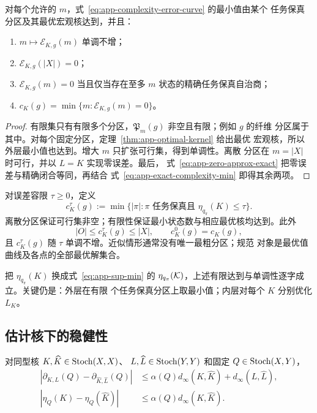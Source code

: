 \begin{theorem}
\label{thm:app-complexity-error-curve}
对每个允许的 $m$，式~\eqref{eq:app-complexity-error-curve} 的最小值由某个
任务保真分区及其最优宏观核达到，并且：
\begin{enumerate}
  \item $m\mapsto\mathcal E_{K,g}(m)$ 单调不增；
  \item $\mathcal E_{K,g}(|X|)=0$；
  \item $\mathcal E_{K,g}(m)=0$ 当且仅当存在至多 $m$ 状态的精确任务保真自治商；
  \item $c_K(g)=\min\{m:\mathcal E_{K,g}(m)=0\}$。
\end{enumerate}
\end{theorem}

\begin{proof}
有限集只有有限多个分区，$\mathfrak P_m(g)$ 非空且有限；例如 $g$ 的纤维
分区属于其中。对每个固定分区，定理~\ref{thm:app-optimal-kernel} 给出最优
宏观核，所以外层最小值也达到。增大 $m$ 只扩张可行集，得到单调性。离散
分区在 $m=|X|$ 时可行，并以 $L=K$ 实现零误差。最后，
式~\eqref{eq:app-zero-approx-exact} 把零误差与精确闭合等同，再结合
式~\eqref{eq:app-exact-complexity-min} 即得其余两项。
\end{proof}

对误差容限 $\tau\ge0$，定义
\begin{equation}
 c_K^\tau(g)
 :=\min\{ |\pi|:\pi\text{ 任务保真且 }\eta_{q_\pi}(K)\le\tau\}.
 \label{eq:app-tolerance-complexity}
\end{equation}
离散分区保证可行集非空；有限性保证最小状态数与相应最优核均达到。此外
\begin{equation}
 |O|\le c_K^\tau(g)\le|X|,
 \qquad
 c_K^0(g)=c_K(g),
\end{equation}
且 $c_K^\tau(g)$ 随 $\tau$ 单调不增。近似情形通常没有唯一最粗分区；规范
对象是最优值曲线及各点的全部最优解集合。

把 $\eta_{q_\pi}(K)$ 换成式~\eqref{eq:app-sup-min} 的
$\eta_{q_\pi}(\mathcal K)$，上述有限达到与单调性逐字成立。关键仍是：外层在有限
个任务保真分区上取最小值；内层对每个 $K$ 分别优化 $L_K$。

\subsection{估计核下的稳健性}

\begin{proposition}[固定通道的模型误差转移]
\label{prop:app-model-perturbation}
对同型核 $K,\widehat K\in\operatorname{Stoch}(X,X)$、
$L,\widehat L\in\operatorname{Stoch}(Y,Y)$ 和固定 $Q\in\operatorname{Stoch}(X,Y)$，
\begin{align}
 \left|\partial_{K,L}(Q)-
 \partial_{\widehat K,\widehat L}(Q)\right|
 &\le \alpha(Q)d_\infty(K,\widehat K)
       +d_\infty(L,\widehat L),
 \label{eq:app-defect-perturbation}\\
 |\eta_Q(K)-\eta_Q(\widehat K)|
 &\le \alpha(Q)d_\infty(K,\widehat K).
 \label{eq:app-eta-perturbation}
\end{align}
\end{proposition}

